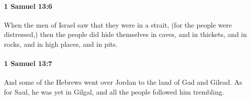 		\paragraph{1 Samuel 13:6} %
			\label{1SAMUEL-13-6}

			When the men of Israel saw that they were in a strait, (for the people were distressed,) then the people did hide themselves in caves, and in thickets, and in rocks, and in high places, and in pits.


		\paragraph{1 Samuel 13:7} %
			\label{1SAMUEL-13-7}

			And some of the Hebrews went over Jordan to the land of Gad and Gilead. As for Saul, he was yet in Gilgal, and all the people followed him trembling.


